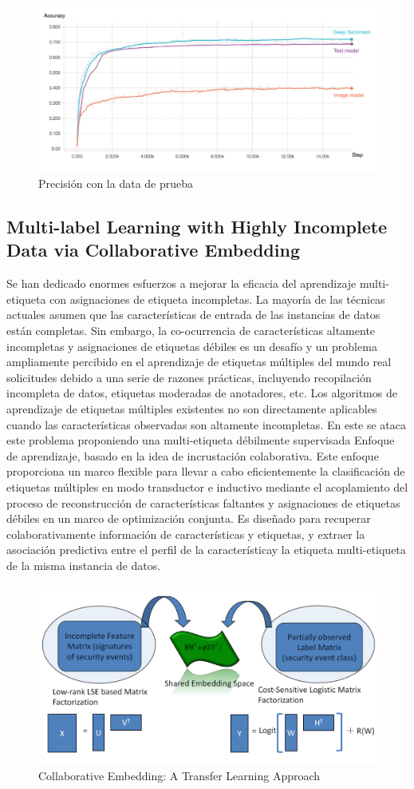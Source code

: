 \documentclass[conference]{IEEEtran}
\begin{document}
\begin{figure}
\centerline{\includegraphics[width=\textwidth,width=9cm]{figura11.png}}
\caption{Precisión con la data de prueba}
\label{fig}
\end{figure}

\subsection{Multi-label Learning with Highly Incomplete Data via Collaborative Embedding}

Se han dedicado enormes esfuerzos a mejorar la eficacia del aprendizaje multi-etiqueta con asignaciones de etiqueta incompletas. La mayoría de las técnicas actuales asumen que las características de entrada de las instancias de datos están completas. Sin embargo, la co-ocurrencia de características altamente incompletas y asignaciones de etiquetas débiles es un desafío y un problema ampliamente percibido en el aprendizaje de etiquetas múltiples del mundo real solicitudes debido a una serie de razones prácticas, incluyendo recopilación incompleta de datos, etiquetas moderadas de anotadores, etc.
Los algoritmos de aprendizaje de etiquetas múltiples existentes no son directamente aplicables cuando las características observadas son altamente incompletas. En este se ataca este problema proponiendo una multi-etiqueta débilmente supervisada
Enfoque de aprendizaje, basado en la idea de incrustación colaborativa.
Este enfoque proporciona un marco flexible para llevar a cabo eficientemente la clasificación de etiquetas múltiples en modo transductor e inductivo
mediante el acoplamiento del proceso de reconstrucción de características faltantes y asignaciones de etiquetas débiles en un marco de optimización conjunta. Es diseñado para recuperar colaborativamente información de características y etiquetas, y extraer la asociación predictiva entre el perfil de la característicay la etiqueta  multi-etiqueta de la misma instancia de datos.


\begin{figure}
\centerline{\includegraphics[width=\textwidth,width=9cm]{figura12.png}}
\caption{Collaborative Embedding: A Transfer Learning Approach}
\label{fig}
\end{figure}
\end{document}
